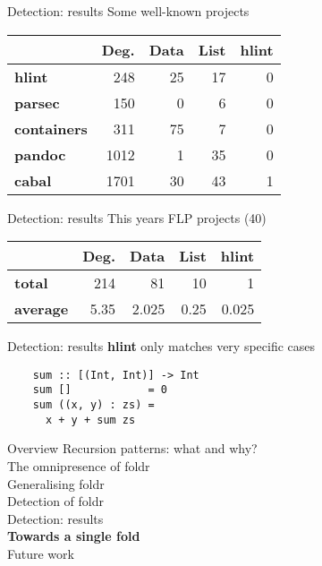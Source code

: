 \documentclass[20pt]{beamer}
\newcommand{\vspaced}{
    \vspace{5mm}
}
\begin{document}
\begin{frame}{Detection: results}
    Some well-known projects \\
    \vspaced
    \begin{tabular}{l|rrr|r}
        & \textbf{Deg.} & \textbf{Data} & \textbf{List} & hlint \\
        \hline
        \textbf{hlint}      &  248 & 25 & 17 & 0 \\
        \textbf{parsec}     &  150 &  0 &  6 & 0 \\
        \textbf{containers} &  311 & 75 &  7 & 0 \\
        \textbf{pandoc}     & 1012 &  1 & 35 & 0 \\
        \textbf{cabal}      & 1701 & 30 & 43 & 1 \\
    \end{tabular}
\end{frame}

\begin{frame}{Detection: results}
    This years FLP projects (40) \\
    \vspaced
    \begin{tabular}{l|rrr|r}
        & \textbf{Deg.} & \textbf{Data} & \textbf{List} & hlint \\
        \hline
        \textbf{total}   &  214 &    81 &   10 &     1 \\
        \textbf{average} & 5.35 & 2.025 & 0.25 & 0.025 \\
    \end{tabular}
\end{frame}

\begin{frame}[fragile]{Detection: results}
    \textbf{hlint} only matches very specific cases \\
    \vspaced
    \begin{lstlisting}
    sum :: [(Int, Int)] -> Int
    sum []            = 0
    sum ((x, y) : zs) =
      x + y + sum zs
    \end{lstlisting}
\end{frame}


\begin{frame}{Overview}
    Recursion patterns: what and why? \\
    The omnipresence of foldr \\
    Generalising foldr \\
    Detection of foldr \\
    Detection: results \\
    \textbf{Towards a single fold} \\
    Future work \\
\end{frame}
\end{document}
